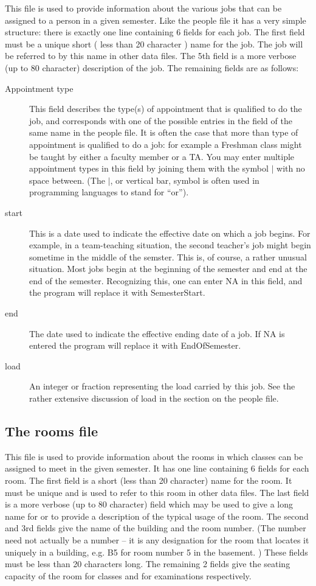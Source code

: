 This file is used to provide information about the various jobs that can
be assigned to a person in a given semester. Like the people file it has
a very simple structure: there is exactly one line containing 6 fields for
each job. The first field must be a unique short ( less than 20 character )
name for the job. The job will be referred to by this name in other
data files. The 5th field is a more verbose (up to 80 character) description
of the job. The remaining fields are as follows:
\begin{description}
\item [Appointment type] This field describes the type(s) of appointment that
is qualified to do the job, and corresponds with one of the possible 
entries in the field of the same name in the people file. It is often the
case that more than type of appointment is qualified to do a job: for example
a Freshman class might be taught by either a faculty member or a TA. You may
enter multiple appointment types in this field by joining them with the
symbol $|$ with no space between. (The $|$, or vertical bar, symbol is often
used in programming languages to stand for ``or''). 
\item [start] This is a date used to indicate the effective date on which
a job begins. For example, in a team-teaching situation, the second teacher's
job might begin sometime in the middle of the semster. This is, of course, a
rather unusual situation. Most jobs begin at the beginning of the semester and
end at the end of the semester. Recognizing this, one can enter NA in this
field, and the program will replace it with SemesterStart. 
\item [end] The date used to indicate the effective ending date of a job. If
NA is entered the program will replace it with EndOfSemester.
\item [load] An integer or fraction representing the load carried by this job.
See the rather extensive discussion of load in the section on the people file.

\end{description}

\subsection{The rooms file}

This file is used to provide information about the rooms in which classes
can be assigned to meet in the given semester. It has one line containing 6
fields for each room. The first field is a short (less than 20 character)
name for the room. It must be unique and is used to refer to this room in
other data files. The last field is a more verbose (up to 80 character)
field which may be used to give a long name for or to provide a description
of the typical usage of the room. The second and 3rd fields give the name
of the building and the room number. (The number need not actually be
a number -- it is any designation for the room that locates it uniquely in
a building, e.g. B5 for room number 5 in the basement. ) These fields must
be less than 20 characters long. The remaining 2 fields give the seating
capacity of the room for classes and for examinations respectively.

